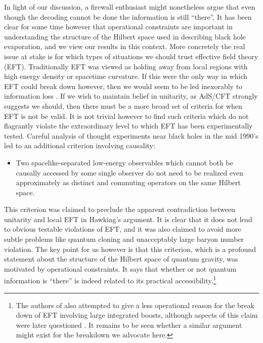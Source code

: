 \documentclass[12pt]{article}
\begin{document}
In light of our discussion, a firewall enthusiast might nonetheless argue that even though the decoding cannot be done the information is still ``there''.  It has been clear for some time however that operational constraints are important in understanding the structure of the Hilbert space used in describing black hole evaporation, and we view our results in this context.  More concretely the real issue at stake is for which types of situations we should trust effective field theory (EFT).  Traditionally EFT was viewed as holding away from local regions with high energy density or spacetime curvature.  If this were the only way in which EFT could break down however, then we would seem to be led inexorably to information loss \cite{Hawking:1976ra}.  If we wish to maintain belief in unitarity, as AdS/CFT strongly suggests we should, then there must be a more broad set of criteria for when EFT is not be valid.  It is not trivial however to find such criteria which do not flagrantly violate the extraordinary level to which EFT has been experimentally tested.  Careful analysis of thought experiments near black holes in the mid 1990's \cite{sussthorug,sussthor,susspol} led to an additional criterion involving causality: 
\begin{itemize}
\item Two spacelike-separated low-energy observables which cannot both be causally accessed by some single observer do not need to be realized even approximately as distinct and commuting operators on the same Hilbert space.  
\end{itemize}
This criterion was claimed to preclude the apparent contradiction between unitarity and local EFT in Hawking's argument.  It is clear that it does not lead to obvious testable violations of EFT, and it was also claimed to avoid more subtle problems like quantum cloning and unacceptably large baryon number violation.  The key point for us however is that this criterion, which is a profound statement about the structure of the Hilbert space of quantum gravity, was motivated by operational constraints.  It says that whether or not quantum information is ``there'' is indeed related to its practical accessibility.\footnote{The authors of \cite{susspol} also attempted to give a less operational reason for the break down of EFT involving large integrated boosts, although aspects of this claim were later questioned \cite{Polchinski:1995ta}.  It remains to be seen whether a similar argument might exist for the breakdown we advocate here.}    
\end{document}
